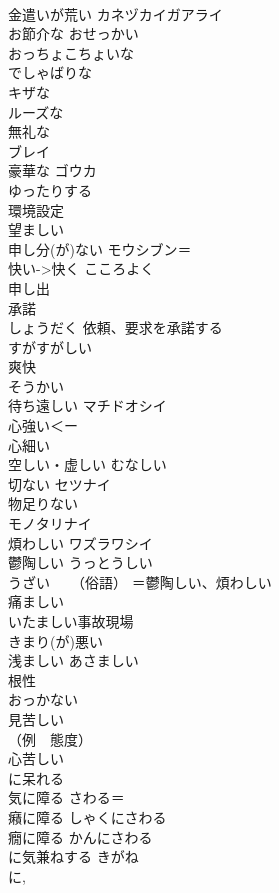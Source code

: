\documentclass[8pt]{extreport}
\begin{document}
\begin{CJK}{UTF8}{min}
\\	金遣いが荒い	カネヅカイガアライ 
\\	お節介な	おせっかい 
\\	おっちょこちょいな	
\\	でしゃばりな	
\\	キザな	
\\	ルーズな	
\\	無礼な	
\\	ブレイ
\\	豪華な	ゴウカ 
\\	ゆったりする	
\\	環境設定	
\\	望ましい	
\\	申し分(が)ない	モウシブン＝
\\	快い->快く	こころよく 
\\	申し出	
\\	承諾	
\\	しょうだく 依頼、要求を承諾する
\\	すがすがしい	
\\	爽快	
\\	そうかい
\\	待ち遠しい	マチドオシイ 
\\	心強い＜ー
\\	心細い	
\\	空しい・虚しい	むなしい 
\\	切ない	セツナイ 
\\	物足りない	
\\	モノタリナイ
\\	煩わしい	ワズラワシイ 
\\	鬱陶しい	うっとうしい 
\\	うざい　　（俗語）	＝鬱陶しい、煩わしい
\\	痛ましい	
\\	いたましい事故現場
\\	きまり(が)悪い	
\\	浅ましい	あさましい 
\\	根性	
\\	おっかない	
\\	見苦しい	
\\	（例　態度）
\\	心苦しい	
\\	に呆れる	
\\	気に障る	さわる＝
\\	癪に障る	しゃくにさわる 
\\	癇に障る	かんにさわる 
\\	に気兼ねする	きがね 
\\	に, 

\end{CJK}
\end{document}
